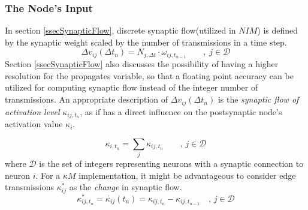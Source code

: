 
		\subsubsection{The Node's Input}	
		
		In section \ref{ssecSynapticFlow}, discrete synaptic flow(utilized in $NIM$) is defined by the synaptic weight scaled by the number of transmissions in a time step.
\begin{equation}
		\Delta v_{ij}(\Delta t_n) = N_{j, \Delta t} \cdot \omega_{ij, t_{n-1}} \qquad,\;j\in\mathcal{D}
		\nonumber
\end{equation}
		Section \ref{ssecSynapticFlow} also discusses the possibility of having a higher resolution for the propagates variable, so that a floating point accuracy can be utilized for computing synaptic flow instead of the integer number of transmissions.
		An appropriate description of $\Delta v_{ij}(\Delta t_n)$  is the \emph{synaptic flow of activation level} $\kappa_{ij, t_n}$, as if has a direct influence on the postsynaptic node's activation value $\kappa_i$.

\begin{equation}
	\kappa_{i, t_n} = \sum_j \kappa_{ij, t_n} \qquad, \, j\in \mathcal{D}
	\nonumber
\end{equation}
		where $\mathcal{D}$ is the set of integers representing neurons with a synaptic connection to neuron $i$.
		For a $\kappa M$ implementation, it might be advantageous to consider edge transmissions $\kappa_{ij}^*$ as the \emph{change} in synaptic flow. %
\begin{equation}
	\kappa_{ij,t_n}^* = \dot{\kappa_{ij}}(t_n) = \kappa_{ij,t_{n}} - \kappa_{ij,t_{n-1}} \quad, \, j\in \mathcal{D}
\end{equation}
		
